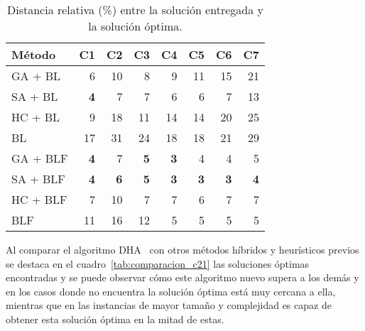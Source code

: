\documentclass[letter, 10pt]{article}
\begin{document}
\begin{table}[H]
    \centering
    \begin{tabular}{|l|rrrrrrr|}
    \hline
    M\'etodo & \multicolumn{1}{l}{C1} & \multicolumn{1}{l}{C2} & \multicolumn{1}{l}{C3} & \multicolumn{1}{l}{C4} & \multicolumn{1}{l}{C5} & \multicolumn{1}{l}{C6} & \multicolumn{1}{l|}{C7} \\ \hline
    GA + BL & 6 & 10 & 8 & 9 & 11 & 15 & 21 \\ \hline
    SA + BL & \textbf{4} & 7 & 7 & 6 & 6 & 7 & 13 \\ \hline
    HC + BL & 9 & 18 & 11 & 14 & 14 & 20 & 25 \\ \hline
    BL & 17 & 31 & 24 & 18 & 18 & 21 & 29 \\ \hline
    GA + BLF & \textbf{4} & 7 & \textbf{5} & \textbf{3} & 4 & 4 & 5 \\ \hline
    SA + BLF & \textbf{4} & \textbf{6} & \textbf{5} & \textbf{3} & \textbf{3} & \textbf{3} & \textbf{4} \\ \hline
    HC + BLF & 7 & 10 & 7 & 7 & 6 & 7 & 7 \\ \hline
    BLF & 11 & 16 & 12 & 5 & 5 & 5 & 5 \\ \hline
    \end{tabular}
    \caption{Distancia relativa (\%) entre la soluci\'on entregada y la soluci\'on \'optima.}
    \label{tab:comparacion_c7}
\end{table}

Al comparar el algoritmo DHA~\cite{he2013heuristics} con otros m\'etodos h\'ibridos y heur\'isticos previos se destaca en el cuadro~\ref{tab:comparacion_c21} las soluciones \'optimas encontradas y se puede observar c\'omo este algoritmo nuevo supera a los dem\'as y en los casos donde no encuentra la soluci\'on \'optima est\'a muy cercana a ella, mientras que en las instancias de mayor tama\~no y complejidad es capaz de obtener esta soluci\'on \'optima en la mitad de estas.
\end{document}
